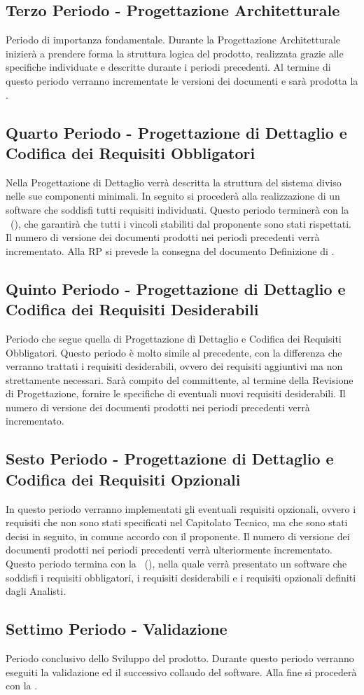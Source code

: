 \documentclass[../PianoDiProgetto.tex]{subfiles}
\begin{document}
	\subsection{Terzo Periodo - Progettazione Architetturale}
	Periodo di importanza fondamentale. Durante la Progettazione Architetturale inizierà a prendere forma la struttura logica del prodotto, realizzata grazie alle specifiche individuate e descritte durante i periodi precedenti. Al termine di questo periodo verranno incrementate le versioni dei documenti e sarà prodotta la .
		
	\subsection{Quarto Periodo - Progettazione di Dettaglio e Codifica dei Requisiti Obbligatori}
	Nella Progettazione di Dettaglio verrà descritta la struttura del sistema diviso nelle sue componenti minimali. In seguito si procederà alla realizzazione di un software che soddisfi tutti requisiti individuati. Questo periodo terminerà con la \revisionediprogettazione\ (), che garantirà che tutti i vincoli stabiliti dal proponente sono stati rispettati. Il numero di versione dei documenti prodotti nei periodi precedenti verrà incrementato. Alla RP si prevede la consegna del documento Definizione di  .
		
	\subsection{Quinto Periodo - Progettazione di Dettaglio e Codifica dei Requisiti Desiderabili}
	Periodo che segue quella di Progettazione di Dettaglio e Codifica dei Requisiti Obbligatori. Questo periodo è molto simile al precedente, con la differenza che verranno trattati i requisiti desiderabili, ovvero dei requisiti aggiuntivi ma non strettamente necessari. Sarà compito del committente, al termine della Revisione di Progettazione, fornire le specifiche di eventuali nuovi requisiti desiderabili. Il numero di versione dei documenti prodotti nei periodi precedenti verrà incrementato.
		
	\subsection{Sesto Periodo - Progettazione di Dettaglio e Codifica dei Requisiti Opzionali}
	In questo periodo verranno implementati gli eventuali requisiti opzionali, ovvero i requisiti che non sono stati specificati nel Capitolato Tecnico, ma che sono stati decisi in seguito, in comune accordo con il proponente. Il numero di versione dei documenti prodotti nei periodi precedenti verrà ulteriormente incrementato. Questo periodo termina con la \revisionediqualifica\ (), nella quale verrà presentato un software che soddisfi i requisiti obbligatori, i requisiti desiderabili e i requisiti opzionali definiti dagli Analisti.
		
	\subsection{Settimo Periodo - Validazione}
	Periodo conclusivo dello Sviluppo del prodotto. Durante questo periodo verranno eseguiti la validazione ed il successivo collaudo del software. Alla fine si procederà con la \revisionediaccettazione. \\
\end{document}
